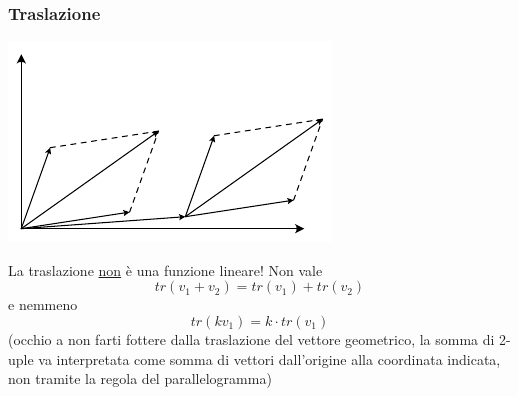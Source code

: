 \subsubsection*{Traslazione}
\begin{center}
	\includegraphics{Images/Traslazione.pdf}
\end{center}
La traslazione \underline{non} è una funzione lineare! Non vale
\[
	tr\left( v_1+v_2 \right) = tr\left( v_1 \right)  + tr\left( v_2 \right)
\]
e nemmeno
\[
	tr\left( kv_1 \right) = k\cdot tr\left( v_1 \right)
\]
(occhio a non farti fottere dalla traslazione del vettore geometrico, la somma di 2-uple va interpretata come somma di vettori dall'origine alla coordinata indicata, non tramite la regola del parallelogramma)
